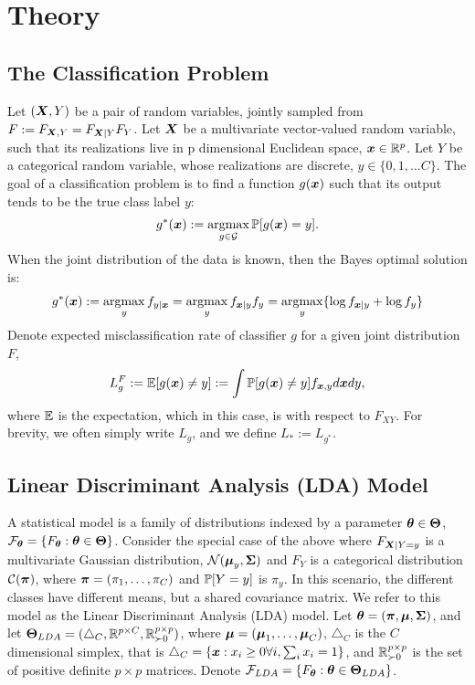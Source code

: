 \documentclass[10pt]{article}
\begin{document}
\clearpage
\appendix
\section{Theory}


\subsection{The Classification Problem}

Let $(\boldsymbol{X},Y)$ be a pair of random variables, jointly sampled from $F :=F_{\boldsymbol{X},Y}=F_{\boldsymbol{X}|Y}F_{Y}$.  
Let $\boldsymbol{X}$ be a multivariate vector-valued random variable, such that its realizations live in p dimensional Euclidean space, $\boldsymbol{x} \in \mathbb{R}^p$.  Let $Y$ be a categorical random variable, whose realizations are discrete,  $y \in \{0,1,\ldots C\}$.  The goal of a classification problem is to find a function $g(\boldsymbol{x})$ such that its output tends to be the true class label $y$:
\begin{align*} %
g^*(\bx) := \argmax_{g \in \mc{G}} \PP[g(\bx) = y].
\end{align*}
When the joint distribution of the data is known, then the Bayes optimal solution is:
\begin{align}  \label{eq:R}
g^*(\bx) := \argmax_y f_{y|\bx} = \argmax_y f_{\bx|y}f_y =\argmax_y \{\log f_{\bx|y} + \log f_y \}
\end{align}
Denote expected misclassification rate of classifier $g$ for a given joint distribution $F$, 
\begin{align*}
L^F_g := \mathbb{E}[g(\boldsymbol{x}) \neq y] := \int \mathbb{P}[g(\boldsymbol{x}) \neq y] f_{\boldsymbol{x},y} d\boldsymbol{x} dy,
\end{align*}
where $\mathbb{E}$ is the expectation, which in this case, is with respect to $F_{XY}$.
For brevity, we often simply write $L_g$, and we define $L_* := L_{g^*}$.  


\subsection{Linear Discriminant Analysis (LDA) Model}

A statistical model is  a family of distributions indexed by a parameter $\boldsymbol{\theta} \in \boldsymbol{\Theta}$, $\mathcal{F}_{\boldsymbol{\theta}}=\{F_{\boldsymbol{\theta}} : \boldsymbol{\theta} \in \boldsymbol{\Theta} \}$.  
Consider the special case of the above where $F_{\boldsymbol{X}|Y=y}$ is a multivariate Gaussian distribution, 
$\mathcal{N}(\boldsymbol{\mu}_y,\boldsymbol{\Sigma})$ and $F_Y$ is a categorical distribution $\mathcal{C}(\boldsymbol{\pi})$, where $\boldsymbol{\pi}=(\pi_1,\ldots,\pi_C)$ and $\mathbb{P}[Y=y]$ is $\pi_y$. In this scenario, the different classes have different means, but a shared covariance matrix. 
We refer to this model as the Linear Discriminant Analysis (LDA) model. 
Let $\boldsymbol{\theta}=(\boldsymbol{\pi},\boldsymbol{\mu},\boldsymbol{\Sigma})$, and let $\boldsymbol{\Theta}_{LDA}=( \triangle_C, \mathbb{R}^{p \times C},\mathbb{R}_{\succ 0}^{p \times p})$, where $\boldsymbol{\mu}=(\boldsymbol{\mu}_1,\ldots, \boldsymbol{\mu}_C)$, $\triangle_C$ is the $C$ dimensional simplex, that is $\triangle_C = \{ \boldsymbol{x} : x_i \geq 0 \forall i, \sum_i x_i = 1\}$, and $\mathbb{R}_{\succ 0}^{p \times p}$ is the set of positive definite  $p \times p$ matrices. Denote
$\mathcal{F}_{LDA}=\{F_{\boldsymbol{\theta}} : \boldsymbol{\theta} \in \boldsymbol{\Theta}_{LDA}\}$.
\end{document}
